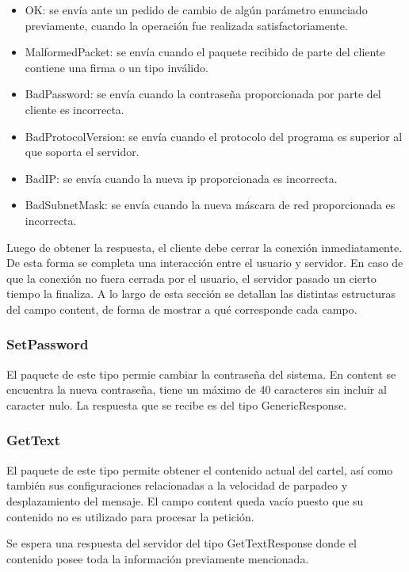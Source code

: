 \begin{itemize}
	\item OK: se envía ante un pedido de cambio de algún parámetro enunciado previamente, cuando la operación fue realizada satisfactoriamente.
	\item MalformedPacket: se envía cuando el paquete recibido de parte del cliente contiene una firma o un tipo inválido.
	\item BadPassword: se envía cuando la contraseña proporcionada por parte del cliente es incorrecta.
	\item BadProtocolVersion: se envía cuando el protocolo del programa es superior al que soporta el servidor.
	\item BadIP: se envía cuando la nueva ip proporcionada es incorrecta.
	\item BadSubnetMask: se envía cuando la nueva máscara de red proporcionada es incorrecta.
\end{itemize}

Luego de obtener la respuesta, el cliente debe cerrar la conexión inmediatamente.
De esta forma se completa una interacción entre el usuario y servidor.
En caso de que la conexión no fuera cerrada por el usuario, el servidor pasado un cierto tiempo la finaliza.
A lo largo de esta sección se detallan las distintas estructuras del campo content, de forma de mostrar a qué corresponde cada campo.



\subsubsection{SetPassword}

El paquete de este tipo permie cambiar la contraseña del sistema.
En content se encuentra la nueva contraseña, tiene un máximo de 40 caracteres sin incluir al caracter nulo.
La respuesta que se recibe es del tipo GenericResponse.



\subsubsection{GetText}

El paquete de este tipo permite obtener el contenido actual del cartel, así como también sus configuraciones relacionadas a la velocidad de parpadeo y desplazamiento del mensaje.
El campo content queda vacío puesto que su contenido no es utilizado para procesar la petición.

Se espera una respuesta del servidor del tipo GetTextResponse donde el contenido posee toda la información previamente mencionada.



